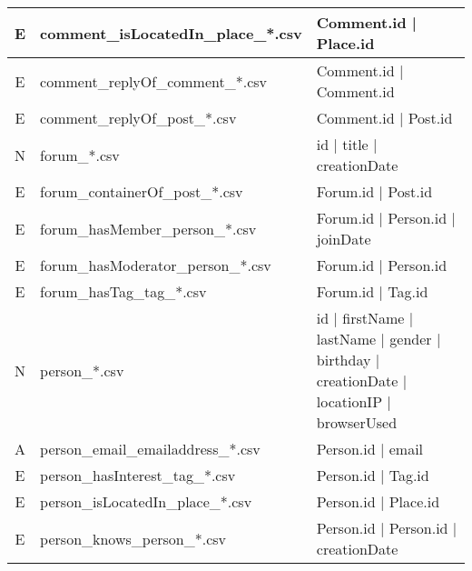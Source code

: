 \begin{table}[htb]
\begin{tabular}{|c|p{4.6cm}|p{9.8cm}|}
        E                       & comment\_isLocatedIn\_place\_*.csv      & Comment.id | Place.id                                                                   \\ \hline
        E                       & comment\_replyOf\_comment\_*.csv        & Comment.id | Comment.id                                                                 \\ \hline
        E                       & comment\_replyOf\_post\_*.csv           & Comment.id | Post.id                                                                    \\ \hline
        N                       & forum\_*.csv                            & id | title | creationDate                                                               \\ \hline
        E                       & forum\_containerOf\_post\_*.csv         & Forum.id | Post.id                                                                      \\ \hline
        E                       & forum\_hasMember\_person\_*.csv         & Forum.id | Person.id | joinDate                                                         \\ \hline
        E                       & forum\_hasModerator\_person\_*.csv      & Forum.id | Person.id                                                                    \\ \hline
        E                       & forum\_hasTag\_tag\_*.csv               & Forum.id | Tag.id                                                                       \\ \hline
        N                       & person\_*.csv                           & id | firstName | lastName | gender | birthday | creationDate | locationIP | browserUsed \\ \hline
        A                       & person\_email\_emailaddress\_*.csv      & Person.id | email                                                                       \\ \hline
        E                       & person\_hasInterest\_tag\_*.csv         & Person.id | Tag.id                                                                      \\ \hline
        E                       & person\_isLocatedIn\_place\_*.csv       & Person.id | Place.id                                                                    \\ \hline
        E                       & person\_knows\_person\_*.csv            & Person.id | Person.id | creationDate                                                    \\ \hline

\end{tabular}
\end{table}
